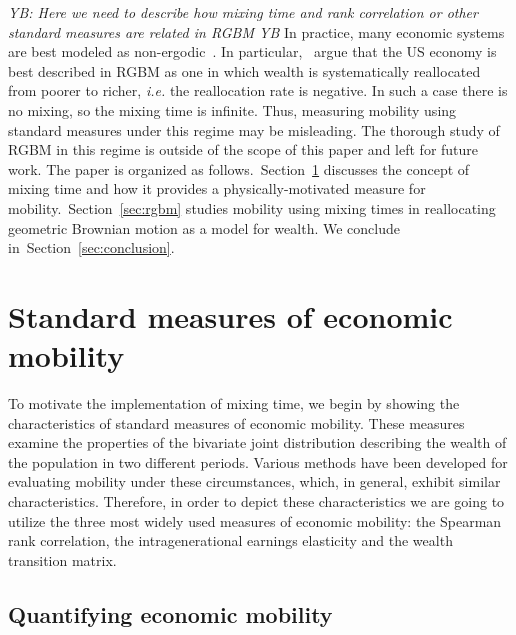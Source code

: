 \documentclass[11pt]{article}
\newcommand{\blue}[1]{{\color{blue} #1}}
\newcommand{\Sref}[1]{Section~\ref{sec:#1}}
\newcommand{\ie}{{\it i.e.}\xspace}
\newcommand{\YB}[1]{\blue{{\it YB: #1 YB}}}
\numberwithin{equation}{section}
\begin{document}
\YB{Here we need to describe how mixing time and rank correlation or other standard measures are related in RGBM}
In practice, many economic systems are best modeled as non-ergodic~\citep{Peters2019b}. In particular,~\citet{BermanPetersAdamou2019} argue that the US economy is best described in RGBM as one in which wealth is systematically reallocated from poorer to richer, \ie the reallocation rate is negative. In such a case there is no mixing, so the mixing time is infinite. Thus, measuring mobility using standard measures under this regime may be misleading. The thorough study of RGBM in this regime is outside of the scope of this paper and left for future work.
The paper is organized as follows.~\Sref{mixingtime} discusses the concept of mixing time and how it provides a physically-motivated measure for mobility.~\Sref{rgbm} studies mobility using mixing times in reallocating geometric Brownian motion as a model for wealth. We conclude in~\Sref{conclusion}.

\section{Standard measures of economic mobility}\label{sec:mixingtime}

To motivate the implementation of mixing time, we begin by showing the characteristics of standard measures of economic mobility. These measures examine the properties of the bivariate joint distribution describing the wealth of the population in two different periods. Various methods have been developed for evaluating mobility under these circumstances, which, in general, exhibit similar characteristics. Therefore, in order to depict these characteristics we are going to utilize the three most widely used measures of economic mobility: the Spearman rank correlation, the intragenerational earnings elasticity and the wealth transition matrix.

\subsection{Quantifying economic mobility}

\end{document}
